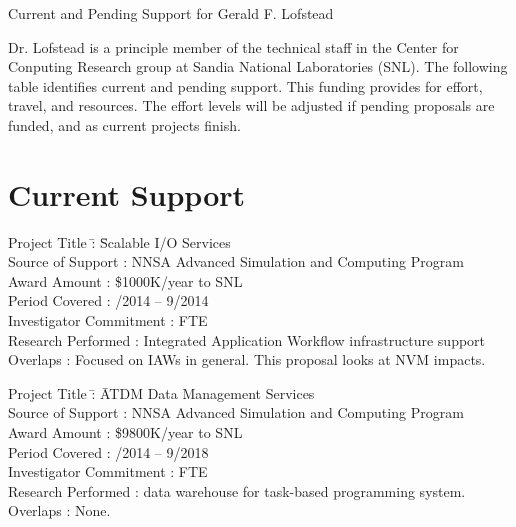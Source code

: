 \documentclass[10pt]{article}
\begin{document}
\begin{center}
{\Large Current and Pending Support for Gerald F. Lofstead}
\end{center}


Dr. Lofstead is a principle member of the technical staff in the Center for
Conputing Research group at Sandia National Laboratories (SNL). The following
table identifies current and pending support. This funding provides for effort,
travel, and resources. The effort levels will be adjusted if pending proposals
are funded, and as current projects finish.

\section*{Current Support}

\begin{tabbing}
Project Title \hspace{5.5em}\=: \= Scalable I/O Services\\
Source of Support           \>: \> NNSA Advanced Simulation and Computing Program\\
Award Amount                \>: \> \$1000K/year to SNL\\
Period Covered              \>: /2014 -- 9/2014\\
Investigator Commitment     \>:  FTE\\
Research Performed          \>: \> Integrated Application Workflow infrastructure support\\
Overlaps                    \>: \> Focused on IAWs in general. This proposal looks at NVM impacts.\\
\end{tabbing}

\begin{tabbing}
Project Title \hspace{5.5em}\=: \= ATDM Data Management Services\\
Source of Support           \>: \> NNSA Advanced Simulation and Computing Program\\
Award Amount                \>: \> \$9800K/year to SNL\\
Period Covered              \>: /2014 -- 9/2018\\
Investigator Commitment     \>:  FTE\\
Research Performed          \>: \> data warehouse for task-based programming system.\\
Overlaps                    \>: \> None.\\
\end{tabbing}
\end{document}
